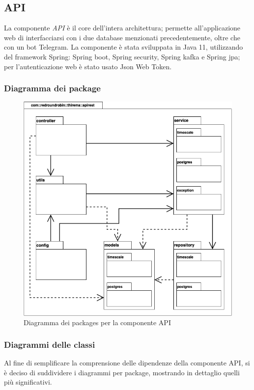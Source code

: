 \subsection{API}
	La componente \textit{API} è il core dell'intera architettura; permette all'applicazione web di interfacciarsi con i due database menzionati precedentemente, oltre che con un bot Telegram.
	\newline
	La componente è stata sviluppata in Java 11, utilizzando del framework Spring: Spring boot, Spring security, Spring kafka e Spring jpa; per l'autenticazione web è stato usato Json Web Token.

	\subsubsection{Diagramma dei package}%
		\begin{figure}[H]
			\centering
			\includegraphics[scale=0.500]{res/images/API/packageAPI.png}
			\caption{Diagramma dei packages per la componente API}
			\label{Diagramma 10}
		\end{figure}

	\subsubsection{Diagrammi delle classi}
		Al fine di semplificare la comprensione delle dipendenze della componente API, si è deciso di suddividere i diagrammi per package, mostrando in dettaglio quelli più significativi.

